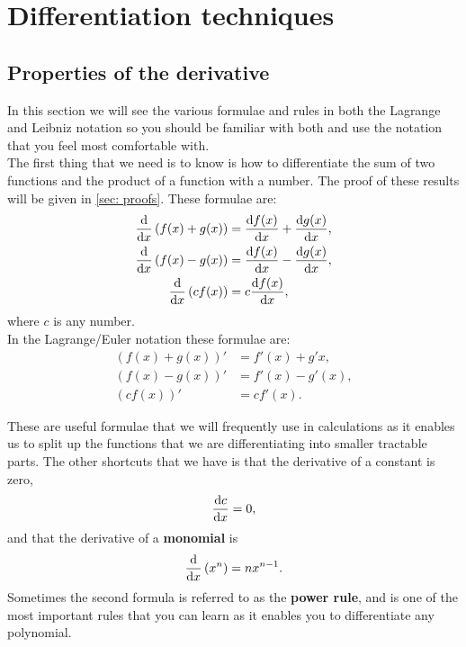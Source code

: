 

\section{Differentiation techniques}

\subsection*{Properties of the derivative}
In this section we will see the various formulae and rules in both the Lagrange and Leibniz notation so you should be familiar with both and use the notation that you feel most comfortable with.\\

The first thing that we need is to know is how to differentiate the sum of two functions and the product of a function with a number.  The proof of these results will be given in \cref{sec: proofs}. These formulae are:
\begin{align}
\frac{\mathrm{d}}{\mathrm{d} x}\left(f(x)+g(x)\right)	&=\frac{\mathrm{d} f(x)}{\mathrm{d} x}+\frac{\mathrm{d} g(x)}{\mathrm{d} x}, \label{eq: derivative of sum}\\
\frac{\mathrm{d}}{\mathrm{d} x}\left(f(x)-g(x)\right)	&=\frac{\mathrm{d} f(x)}{\mathrm{d} x}-\frac{\mathrm{d} g(x)}{\mathrm{d} x}, \label{eq: derivative of difference}\\
\frac{\mathrm{d}}{\mathrm{d} x}\left(cf(x)\right)	&=c\frac{\mathrm{d} f(x)}{\mathrm{d} x},\label{eq: derivative scalar multiplication}
\end{align}
where $c$ is any number.\\

In the Lagrange/Euler notation these formulae are:
\begin{align}
\left(f(x)+g(x)\right)'	&=f'(x)+g'{x}, \label{eq: derivative of sum 2}\\
\left(f(x)-g(x)\right)'&=f'(x)-g'(x), \label{eq: derivative of difference 2}\\
\left(cf(x)\right)'	&=cf'(x). \label{eq: derivative scalar multiplication 2}
\end{align}

These are useful formulae that we will frequently use in calculations as it enables us to split up the functions that we are differentiating into smaller tractable parts. The other shortcuts that we have is that the derivative of a constant is zero,
\begin{equation}
\frac{\mathrm{d} c}{\mathrm{d} x}=0, \label{eq: derivative of constant}
\end{equation}
and that the derivative of a \textbf{monomial} is
\begin{equation}
\frac{\mathrm{d}}{\mathrm{d} x}\left(x^{n}\right)=nx^{n-1}. \label{eq: monomial derivative}
\end{equation}
Sometimes the second formula is referred to as the \textbf{power rule}, and is one of the most important rules that you can learn as it enables you to differentiate any polynomial.\\

